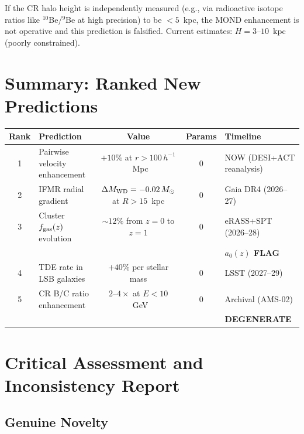\documentclass[11pt]{article}
\begin{document}
If the CR halo height is independently measured (e.g., via radioactive
isotope ratios like $^{10}$Be/$^9$Be at high precision) to be $< 5$~kpc,
the MOND enhancement is not operative and this prediction is falsified.
Current estimates: $H = 3$--$10$~kpc (poorly constrained).

\section{Summary: Ranked New Predictions}
\label{sec:summary}

\begin{center}
\small
\begin{tabular}{clccl}
\toprule
\textbf{Rank} & \textbf{Prediction} & \textbf{Value} & \textbf{Params} & \textbf{Timeline} \\
\midrule
1 & Pairwise velocity enhancement & $+10\%$ at $r > 100\,h^{-1}$~Mpc & 0 & NOW (DESI+ACT reanalysis) \\
2 & IFMR radial gradient & $\Delta M_{\rm WD} = -0.02\,M_\odot$ at $R > 15$~kpc & 0 & Gaia DR4 (2026--27) \\
3 & Cluster $f_{\rm gas}(z)$ evolution & $\sim 12\%$ from $z=0$ to $z=1$ & 0 & eRASS+SPT (2026--28) \\
  & & & & \textbf{$a_0(z)$ FLAG} \\
4 & TDE rate in LSB galaxies & $+40\%$ per stellar mass & 0 & LSST (2027--29) \\
5 & CR B/C ratio enhancement & $2$--$4\times$ at $E < 10$~GeV & 0 & Archival (AMS-02) \\
  & & & & \textbf{DEGENERATE} \\
\bottomrule
\end{tabular}
\end{center}

\section{Critical Assessment and Inconsistency Report}
\label{sec:assessment}

\subsection{Genuine Novelty}
\end{document}
